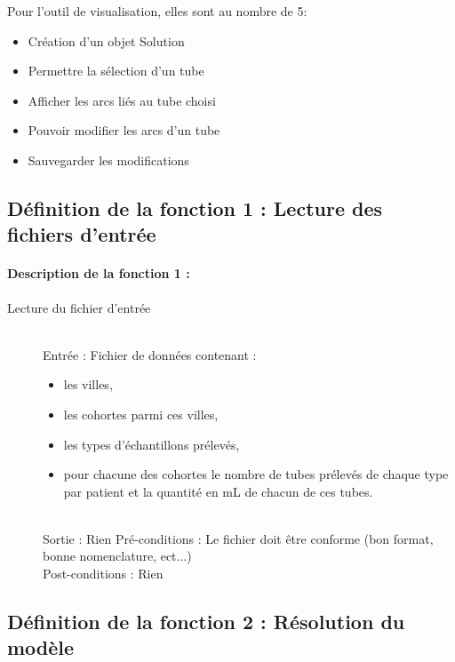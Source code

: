 \documentclass{polytech/polytech}
\numberwithin{figure}{chapter}
\begin{document}
\begin{appendix}
Pour l'outil de visualisation, elles sont au nombre de 5:
\begin{itemize}
    \item Création d'un objet Solution
    \item Permettre la sélection d'un tube
    \item Afficher les arcs liés au tube choisi
    \item Pouvoir modifier les arcs d'un tube
    \item Sauvegarder les modifications
\end{itemize}


\subsection{ Définition de la fonction 1 : Lecture des fichiers d'entrée}

\paragraph{Description de la fonction 1 :}
 
\begin{description}
    \item[Lecture du fichier d'entrée] ~ \\
        Entrée : Fichier de données contenant :
        \begin{itemize}
            \item les villes,
            \item les cohortes parmi ces villes,
            \item les types d'échantillons prélevés,
            \item pour chacune des cohortes le nombre de tubes prélevés de chaque type par patient et la quantité en mL de chacun de ces tubes. 
        \end{itemize} \\
        Sortie : Rien
        Pré-conditions : Le fichier doit être conforme (bon format, bonne nomenclature, ect...) \\
        Post-conditions : Rien
\end{description}

\pagebreak

\subsection{Définition de la fonction 2 : Résolution du modèle}


\end{appendix}
\end{document}
